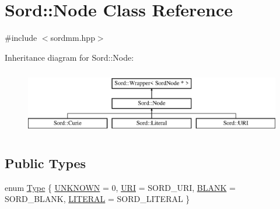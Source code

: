 \hypertarget{class_sord_1_1_node}{}\section{Sord\+:\+:Node Class Reference}
\label{class_sord_1_1_node}


{\ttfamily \#include $<$sordmm.\+hpp$>$}

Inheritance diagram for Sord\+:\+:Node\+:\begin{figure}[H]
\begin{center}
\leavevmode
\includegraphics[height=2.871795cm]{class_sord_1_1_node}
\end{center}
\end{figure}
\subsection*{Public Types}
\begin{DoxyCompactItemize}
\item 
enum \hyperlink{class_sord_1_1_node_a7e88bd1ee36843d0ec897a11b83bb3bb}{Type} \{ \hyperlink{class_sord_1_1_node_a7e88bd1ee36843d0ec897a11b83bb3bba37dccf090995b8f037e9a4355ccacfd0}{U\+N\+K\+N\+O\+WN} = 0, 
\hyperlink{class_sord_1_1_node_a7e88bd1ee36843d0ec897a11b83bb3bba676addcea4ed7b2423da53e1ba585fa0}{U\+RI} = S\+O\+R\+D\+\_\+\+U\+RI, 
\hyperlink{class_sord_1_1_node_a7e88bd1ee36843d0ec897a11b83bb3bbaaaf1cc036e45843597f24b37647a9751}{B\+L\+A\+NK} = S\+O\+R\+D\+\_\+\+B\+L\+A\+NK, 
\hyperlink{class_sord_1_1_node_a7e88bd1ee36843d0ec897a11b83bb3bbad26ac4c73e5f677fba837f74cfb63afb}{L\+I\+T\+E\+R\+AL} = S\+O\+R\+D\+\_\+\+L\+I\+T\+E\+R\+AL
 \}
\end{DoxyCompactItemize}
